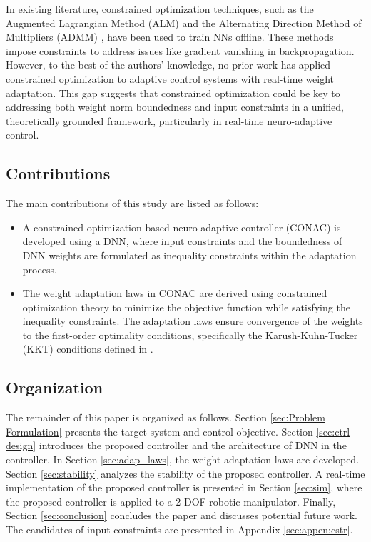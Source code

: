 \documentclass[lettersize,journal]{IEEEtran}
\begin{document}
In existing literature, constrained optimization techniques, such as the Augmented Lagrangian Method (ALM) \cite{Evens:2021aa} and the Alternating Direction Method of Multipliers (ADMM) \cite{Wang:2019aa,Taylor:2016aa}, have been used to train NNs offline. 
These methods impose constraints to address issues like gradient vanishing in backpropagation. 
However, to the best of the authors' knowledge, no prior work has applied constrained optimization to adaptive control systems with real-time weight adaptation. 
This gap suggests that constrained optimization could be key to addressing both weight norm boundedness and input constraints in a unified, theoretically grounded framework, particularly in real-time neuro-adaptive control.

\subsection{Contributions}

The main contributions of this study are listed as follows:
\begin{itemize}
    \item A constrained optimization-based neuro-adaptive controller (CONAC) is developed using a DNN, where input constraints and the boundedness of DNN weights are formulated as inequality constraints within the adaptation process.
    \item The weight adaptation laws in CONAC are derived using constrained optimization theory to minimize the objective function while satisfying the inequality constraints. The adaptation laws ensure convergence of the weights to the first-order optimality conditions, specifically the Karush-Kuhn-Tucker (KKT) conditions defined in \cite[Chap. 12 Thm. 12.1]{Nocedal:2006aa}. 
\end{itemize}

\subsection{Organization}


The remainder of this paper is organized as follows. 
Section \ref{sec:Problem Formulation} presents the target system and control objective.
Section \ref{sec:ctrl design} introduces the proposed controller and the architecture of DNN in the controller. 
In Section \ref{sec:adap_laws}, the weight adaptation laws are developed.
Section \ref{sec:stability} analyzes the stability of the proposed controller.
A real-time implementation of the proposed controller is presented in Section \ref{sec:sim}, where the proposed controller is applied to a 2-DOF robotic manipulator.
Finally, Section \ref{sec:conclusion} concludes the paper and discusses potential future work.
The candidates of input constraints are presented in Appendix \ref{sec:appen:cstr}.
\end{document}
